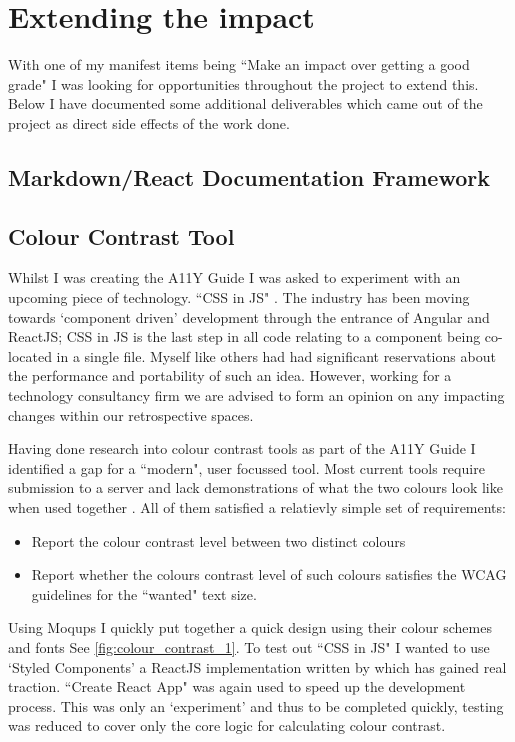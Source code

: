 \section{Extending the impact}
With one of my manifest items being ``Make an impact over getting a good
grade" I was looking for opportunities throughout the project to extend this.
Below I have documented some additional deliverables which came out of the
project as direct side effects of the work done.

\subsection{Markdown/React Documentation Framework}
\subsection{Colour Contrast Tool}
Whilst I was creating the A11Y Guide I was asked to experiment with an
upcoming piece of technology. ``CSS in JS" \citep{CSSInJS}. The industry has been moving
towards `component driven' development \citep{CDD} through the entrance of
Angular
and ReactJS; CSS in JS is the last step in all code relating to a
component being co-located in a single file. Myself like others had had
significant reservations \citep{AgainstCssInJs} about the performance and portability of
such an idea. However, working for a technology consultancy firm we are
advised to form an opinion on any impacting changes within our retrospective
spaces.

Having done research into colour contrast tools as part of the A11Y Guide I
identified a gap for a ``modern", user focussed tool. Most current tools
require submission to a server and lack demonstrations
of what the two colours look like when used together \cite*{JuicyStudio}. All
of them satisfied a relatievly simple set of requirements:
\begin{itemize}
\item Report the colour contrast level between two distinct colours
\item Report whether the colours contrast level of such colours satisfies the
 WCAG guidelines for the ``wanted" text size.
\end{itemize}

Using Moqups \citep{Moqups} I quickly put together a quick design using
their colour schemes and fonts See \ref{fig:colour_contrast_1}. To test out
``CSS in JS" I wanted to use `Styled Components' a ReactJS implementation
written by \cite*{StyledComponents} which has gained real traction. ``Create
React App" was again used to speed up the development process. This was
only an `experiment' and thus to be completed quickly, testing was reduced to
cover only the core logic for calculating colour contrast.

